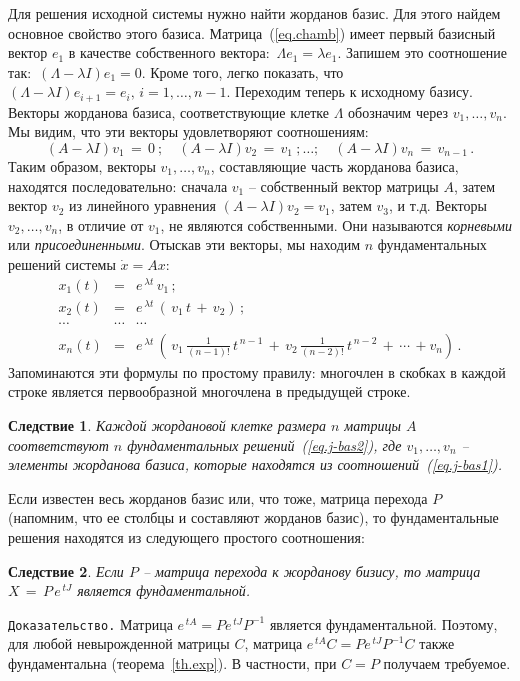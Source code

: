 \documentclass[12pt,a4paper]{article}
\newtheorem{cor}{Следствие}
\begin{document}
Для решения исходной системы нужно найти жорданов базис. Для этого найдем
основное свойство этого базиса. Матрица~(\ref{eq.chamb}) имеет первый базисный вектор $e_1$
в качестве собственного  вектора: $\, \Lambda e_1 = \lambda e_1$.
Запишем это соотношение так: $\, (\Lambda - \lambda I)e_1 = 0$.
Кроме того, легко показать, что $(\Lambda - \lambda I)e_{i+1} = e_i, \, i = 1, \ldots , n-1$.
Переходим теперь к исходному базису. Векторы жорданова базиса, соответствующие
клетке $\Lambda$ обозначим через $v_1, \ldots , v_n$. Мы видим, что эти векторы удовлетворяют соотношениям:
\begin{equation}\label{eq.j-bas1}
(A - \lambda I)v_1 \, = \, 0\ ; \quad (A - \lambda I)v_2 \, = \, v_1 \ ; \ldots ; \quad
(A - \lambda I)v_n \, = \, v_{n-1}\, .
\end{equation}
Таким образом, векторы $v_1, \ldots , v_n$, составляющие часть жорданова базиса,
находятся последовательно: сначала $v_1$ -- собственный вектор матрицы $A$, затем
вектор $v_2$ из линейного уравнения $(A - \lambda I)v_2  = v_1$, затем $v_3$, и т.д.
Векторы $v_2, \ldots , v_n$, в отличие от $v_1$, не являются собственными. Они называются
{\em корневыми} или {\em присоединенными}. Отыскав эти векторы,
мы находим $n$ фундаментальных решений системы $\dot x = Ax$:
\begin{equation}\label{eq.j-bas2}
\begin{array}{lll}
x_1(t) & = & e^{\, \lambda t}\, v_1\, ; \\
x_2(t) & = & e^{\, \lambda t}\, \left( \, v_1\, t \, + \, v_2 \right) \, ; \\
\cdots & \cdots & \cdots \\
x_n(t) & = & e^{\, \lambda t}\, \left( \, v_1\, \frac{1}{(n-1)!}\, t^{\, n-1} \, + \, v_2\, \frac{1}{(n-2)!}\, t^{\, n-2} \, + \, \cdots \, + v_n \right) \, .
\end{array}
\end{equation}
Запоминаются эти формулы по простому правилу: многочлен в скобках в каждой строке является первообразной
многочлена в предыдущей строке.
\begin{cor}\label{c.lin-exp4}
Каждой жордановой клетке размера $n$ матрицы $A$ соответствуют $n$ фундаментальных решений~(\ref{eq.j-bas2}),
где $v_1, \ldots , v_n$ -- элементы жорданова базиса, которые находятся из соотношений~(\ref{eq.j-bas1}).
\end{cor}
Если известен весь жорданов базис или, что тоже, матрица перехода $P$ (напомним, что ее столбцы и составляют жорданов базис), то фундаментальные решения находятся из следующего простого соотношения:
\begin{cor}\label{c.lin-exp5}
Если $P$ -- матрица перехода к жорданову бизису, то матрица $X\,  = \,  P\, e^{\, tJ}$ является фундаментальной.
\end{cor}
{\tt Доказательство.} Матрица $e^{\, tA} = Pe^{\, tJ}P^{-1}$ является фундаментальной.
Поэтому, для любой невырожденной матрицы $C$, матрица $e^{\, tA}C = Pe^{\, tJ}P^{-1}C$ также фундаментальна
(теорема~\ref{th.exp}). В частности, при $C = P$ получаем требуемое.
\end{document}
